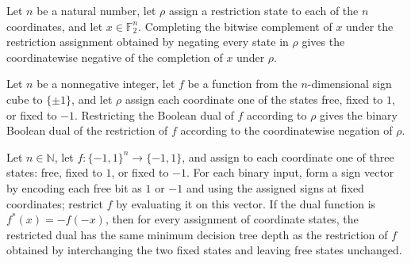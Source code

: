 \begin{theorem}
\label{FABL.CoordRestriction.complete_negateAssignment}
\leanok
{}
Let $n$ be a natural number, let $\rho$ assign a restriction state to each of the $n$
coordinates, and let $x\in\mathbb{F}_2^n$. Completing the bitwise complement of $x$
under the restriction assignment obtained by negating every state in $\rho$ gives the
coordinatewise negative of the completion of $x$ under $\rho$.
\end{theorem}

\begin{theorem}
\label{FABL.CoordRestriction.restrict_booleanDual}
\leanok
{}
Let $n$ be a nonnegative integer, let $f$ be a function from the $n$-dimensional sign
cube to $\{\pm1\}$, and let $\rho$ assign each coordinate one of the states free, fixed
to $1$, or fixed to $-1$. Restricting the Boolean dual of $f$ according to $\rho$ gives
the binary Boolean dual of the restriction of $f$ according to the coordinatewise
negation of $\rho$.
\end{theorem}

\begin{theorem}
\label{FABL.decisionTreeDepth_restrict_booleanDual}
\leanok
{}
Let $n\in\mathbb{N}$, let $f:\{−1,1\}^n\to\{−1,1\}$, and assign to each coordinate one
of three states: free, fixed to $1$, or fixed to $-1$. For each binary input, form a
sign vector by encoding each free bit as $1$ or $-1$ and using the assigned signs at
fixed coordinates; restrict $f$ by evaluating it on this vector. If the dual function is
$f^*(x)=-f(-x)$, then for every assignment of coordinate states, the restricted dual has
the same minimum decision tree depth as the restriction of $f$ obtained by interchanging
the two fixed states and leaving free states unchanged.
\end{theorem}

